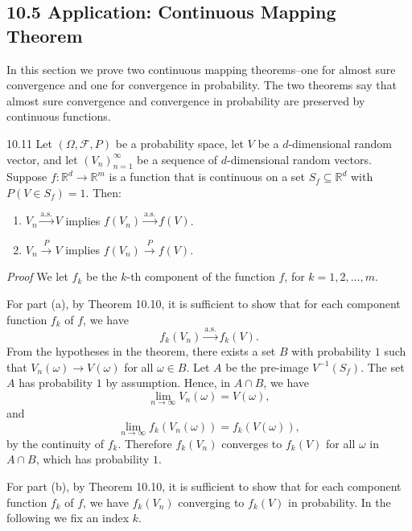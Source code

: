 \subsection*{10.5 Application: Continuous Mapping Theorem}

In this section we prove two continuous mapping theorems--one for almost sure convergence and one for convergence in probability. The two theorems say that almost sure convergence and convergence in probability are preserved by continuous functions.

\begin{thmbox}{10.11}
Let $(\Omega,\mathcal{F},P)$ be a probability space, let $V$ be a $d$-dimensional random vector, and let $(V_n)_{n=1}^{\infty}$ be a sequence of $d$-dimensional random vectors. Suppose $f:\mathbb{R}^d\to\mathbb{R}^m$ is a function that is continuous on a set $S_f\subseteq\mathbb{R}^d$ with $P(V\in S_f)=1$. Then:
\begin{enumerate}
\item $V_n\xrightarrow{\mathrm{a.s.}}V$ implies $f(V_n)\xrightarrow{\mathrm{a.s.}}f(V)$.
\item $V_n\xrightarrow{P}V$ implies $f(V_n)\xrightarrow{P}f(V)$.
\end{enumerate}
\end{thmbox}

\textit{Proof}
We let $f_k$ be the $k$-th component of the function $f$, for $k=1,2,\ldots,m$.

For part (a), by Theorem 10.10, it is sufficient to show that for each component function $f_k$ of $f$, we have
\[
f_k(V_n)\xrightarrow{\mathrm{a.s.}}f_k(V).
\]
From the hypotheses in the theorem, there exists a set $B$ with probability $1$ such that $V_n(\omega)\to V(\omega)$ for all $\omega\in B$. Let $A$ be the pre-image $V^{-1}(S_f)$. The set $A$ has probability $1$ by assumption. Hence, in $A\cap B$, we have
\[
\lim_{n\to\infty}V_n(\omega)=V(\omega),
\]
and
\[
\lim_{n\to\infty}f_k(V_n(\omega))=f_k(V(\omega)),
\]
by the continuity of $f_k$. Therefore $f_k(V_n)$ converges to $f_k(V)$ for all $\omega$ in $A\cap B$, which has probability $1$.

For part (b), by Theorem 10.10, it is sufficient to show that for each component function $f_k$ of $f$, we have $f_k(V_n)$ converging to $f_k(V)$ in probability. In the following we fix an index $k$.

